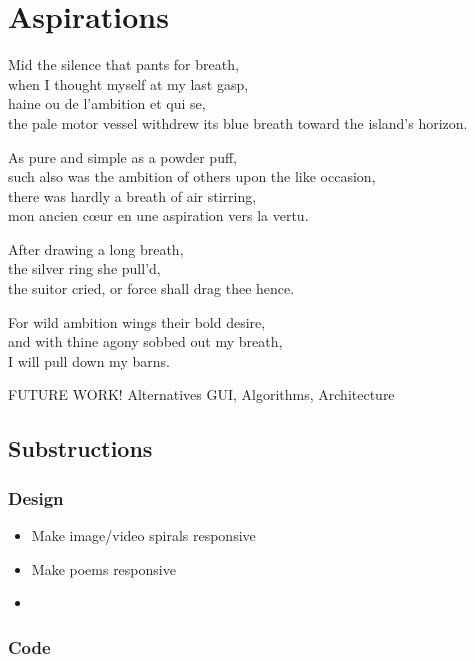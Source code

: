 
\chapter{Aspirations}
\label{ch:future}

\startcontents[chapters]

\vfill

Mid the silence that pants for breath, \\
when I thought myself at my last gasp, \\
haine ou de l'ambition et qui se, \\
the pale motor vessel withdrew its blue breath toward the island's horizon.

As pure and simple as a powder puff, \\
such also was the ambition of others upon the like occasion, \\
there was hardly a breath of air stirring, \\
mon ancien cœur en une aspiration vers la vertu.

After drawing a long breath, \\
the silver ring she pull'd, \\
the suitor cried, or force shall drag thee hence.

For wild ambition wings their bold desire, \\
and with thine agony sobbed out my breath, \\
I will pull down my barns.

\newpage
\minicontents
\spirals

FUTURE WORK!
Alternatives
GUI, Algorithms, Architecture


\section{Substructions}

\subsection{Design}

\begin{itemize}
  \item Make image/video spirals responsive
  \item Make poems responsive
  \item
\end{itemize}

\subsection{Code}


